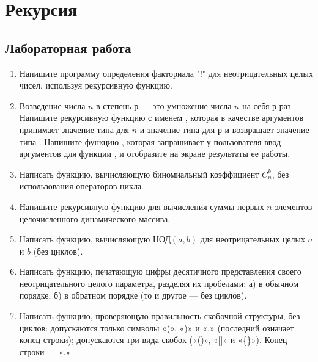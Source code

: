 \chapter{Рекурсия}
\section{Лабораторная работа}
\begin{enumerate}[leftmargin=*]
    \item Напишите программу определения факториала "!" для неотрицательных целых чисел, используя рекурсивную функцию.
    \item Возведение числа $n$ в степень $р$ — это умножение числа $n$ на себя $р$ раз. Напишите рекурсивную функцию с именем , которая в качестве аргументов принимает значение типа  для $n$ и значение типа  для $р$ и возвращает значение типа . Напишите функцию , которая запрашивает у пользователя ввод аргументов для функции , и отобразите на экране результаты ее работы.
    \item Написать функцию, вычисляющую биномиальный коэффициент $C_n^k$, без использования операторов цикла.
    \item Напишите рекурсивную функцию для вычисления суммы первых $n$ элементов целочисленного динамического массива.
    \item Написать функцию, вычисляющую $\textbf{НОД}(a,b)$ для неотрицательных целых $a$ и $b$ (без циклов).
    \item Написать функцию, печатающую цифры десятичного представления своего неотрицательного целого параметра, разделяя их пробелами: а) в обычном порядке; б) в обратном порядке (то и другое — без циклов).
    \item Написать функцию, проверяющую правильность скобочной структуры, без циклов:
    допускаются только символы «(», «)» и «.» (последний означает конец строки);
    допускаются три вида скобок («()», «[]» и «\{\}»). Конец строки — «.»
    
    
    
\end{enumerate}